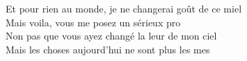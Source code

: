 \songwordfb{} Et pour rien au monde, je ne changerai  goût de ce miel \\
\songwordfb{} Mais voila, vous me posez un sérieux pro \\
\songwordfb{} Non pas que vous ayez changé la leur de mon ciel \\
\songwordfb{} Mais les choses aujourd'hui ne sont plus les mes \\
